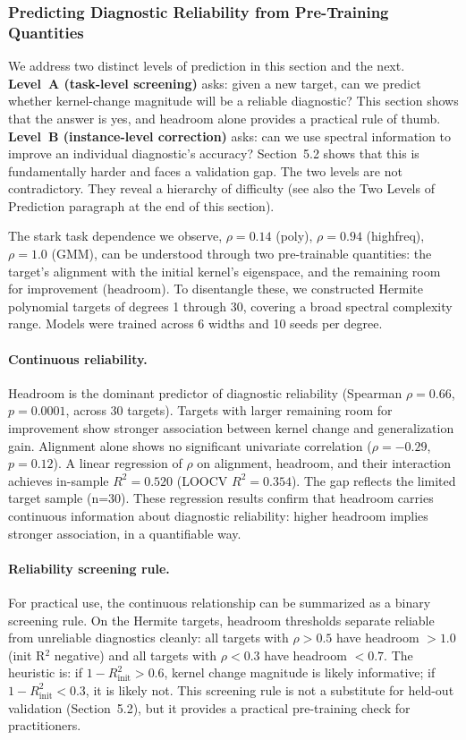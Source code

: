 \documentclass[twoside,11pt]{article}
\begin{document}
\subsubsection{Predicting Diagnostic Reliability from Pre-Training Quantities}

We address two distinct levels of prediction in this section and the next.  \textbf{Level~A (task-level screening)} asks: given a new target, can we predict whether kernel-change magnitude will be a reliable diagnostic?  This section shows that the answer is yes, and headroom alone provides a practical rule of thumb.  \textbf{Level~B (instance-level correction)} asks: can we use spectral information to improve an individual diagnostic's accuracy?  Section~5.2 shows that this is fundamentally harder and faces a validation gap.  The two levels are not contradictory. They reveal a hierarchy of difficulty (see also the Two Levels of Prediction paragraph at the end of this section).

The stark task dependence we observe, $\rho=0.14$ (poly), $\rho=0.94$ (highfreq), $\rho=1.0$ (GMM), can be understood through two pre-trainable quantities: the target's alignment with the initial kernel's eigenspace, and the remaining room for improvement (headroom). To disentangle these, we constructed Hermite polynomial targets of degrees 1 through 30, covering a broad spectral complexity range. Models were trained across 6 widths and 10 seeds per degree.

\paragraph{Continuous reliability.} Headroom is the dominant predictor of diagnostic reliability (Spearman $\rho=0.66$, $p=0.0001$, across 30 targets). Targets with larger remaining room for improvement show stronger association between kernel change and generalization gain. Alignment alone shows no significant univariate correlation ($\rho=-0.29$, $p=0.12$). A linear regression of $\rho$ on alignment, headroom, and their interaction achieves in-sample $R^2=0.520$ (LOOCV $R^2=0.354$). The gap reflects the limited target sample (n=30). These regression results confirm that headroom carries continuous information about diagnostic reliability: higher headroom implies stronger association, in a quantifiable way.

\paragraph{Reliability screening rule.} For practical use, the continuous relationship can be summarized as a binary screening rule. On the Hermite targets, headroom thresholds separate reliable from unreliable diagnostics cleanly: all targets with $\rho > 0.5$ have headroom $> 1.0$ (init R$^2$ negative) and all targets with $\rho < 0.3$ have headroom $< 0.7$. The heuristic is: if $1-R^2_{\text{init}} > 0.6$, kernel change magnitude is likely informative; if $1-R^2_{\text{init}} < 0.3$, it is likely not. This screening rule is not a substitute for held-out validation (Section~5.2), but it provides a practical pre-training check for practitioners.
\end{document}

